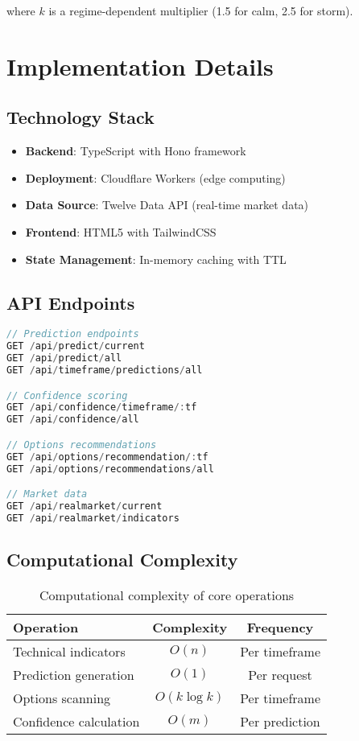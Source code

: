 \documentclass[12pt,a4paper]{article}
\begin{document}
where $k$ is a regime-dependent multiplier (1.5 for calm, 2.5 for storm).

\section{Implementation Details}

\subsection{Technology Stack}

\begin{itemize}
    \item \textbf{Backend}: TypeScript with Hono framework
    \item \textbf{Deployment}: Cloudflare Workers (edge computing)
    \item \textbf{Data Source}: Twelve Data API (real-time market data)
    \item \textbf{Frontend}: HTML5 with TailwindCSS
    \item \textbf{State Management}: In-memory caching with TTL
\end{itemize}

\subsection{API Endpoints}

\begin{lstlisting}[language=JavaScript,caption=Core API Structure]
// Prediction endpoints
GET /api/predict/current
GET /api/predict/all
GET /api/timeframe/predictions/all

// Confidence scoring
GET /api/confidence/timeframe/:tf
GET /api/confidence/all

// Options recommendations
GET /api/options/recommendation/:tf
GET /api/options/recommendations/all

// Market data
GET /api/realmarket/current
GET /api/realmarket/indicators
\end{lstlisting}

\subsection{Computational Complexity}

\begin{table}[H]
\centering
\begin{tabular}{|l|c|c|}
\hline
\textbf{Operation} & \textbf{Complexity} & \textbf{Frequency} \\
\hline
Technical indicators & $O(n)$ & Per timeframe \\
Prediction generation & $O(1)$ & Per request \\
Options scanning & $O(k \log k)$ & Per timeframe \\
Confidence calculation & $O(m)$ & Per prediction \\
\hline
\end{tabular}
\caption{Computational complexity of core operations}
\end{table}
\end{document}
